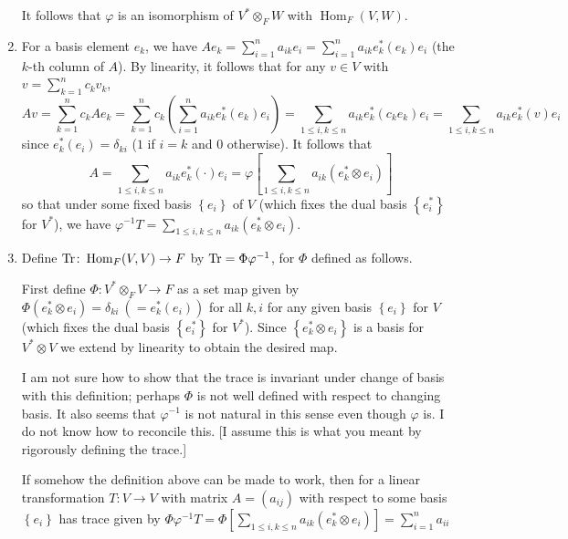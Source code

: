 \documentclass[11pt]{article}
\newcommand{\br}[1]{\left(#1\right)}
\newcommand{\sbr}[1]{\left[#1\right]}
\newcommand{\cbr}[1]{\left\{#1\right\}}
\DeclareMathOperator{\Hom}{Hom}
\begin{document}
\begin{enumerate}[label=(\alph*)]
    It follows that $\varphi$ is an isomorphism of $V^\ast\otimes_F W$ with $\Hom_F(V,W)$.
    \item For a basis element $e_k$, we have $Ae_k = \sum_{i=1}^n a_{ik}e_i = \sum_{i=1}^n a_{ik}e^\ast_k(e_k)e_i$ (the $k$-th column of $A$). By linearity, it follows that for any $v\in V$ with $v = \sum_{k=1}^nc_kv_k$, \[Av = \sum_{k=1}^n c_k Ae_k = \sum_{k=1}^n c_k \br{\sum_{i=1}^n a_{ik}e^\ast_k(e_k)e_i} = \sum_{1\leq i,k\leq n} a_{ik}e^\ast_k(c_ke_k)e_i = \sum_{1\leq i,k\leq n} a_{ik}e^\ast_k(v)e_i\] since $e^\ast_k(e_i) = \delta_{ki}$ ($1$ if $i=k$ and $0$ otherwise). It follows that \[A = \sum_{1\leq i,k\leq n} a_{ik}e^\ast_k(\cdot)e_i = \varphi\sbr{\sum_{1\leq i,k\leq n} a_{ik}(e^\ast_k\otimes e_i)}\] so that under some fixed basis $\cbr{e_i}$ of $V$ (which fixes the dual basis $\cbr{e_i^\ast}$ for $V^\ast$), we have $\varphi^{-1}T = \sum_{1\leq i,k\leq n} a_{ik}(e^\ast_k\otimes e_i)$. 
    \item Define $\Tr\colon \Hom_F(V,V)\to F$ by $\Tr = \Phi\varphi^{-1}$, for $\Phi$ defined as follows.
    
    First define $\Phi\colon V^\ast\otimes_F V\to F$ as a set map given by $\Phi(e^\ast_k\otimes e_i) = \delta_{ki} ~(= e^\ast_k(e_i))$ for all $k,i$ for any given basis $\cbr{e_i}$ for $V$ (which fixes the dual basis $\cbr{e^\ast_i}$ for $V^\ast$). Since $\cbr{e^\ast_k\otimes e_i}$ is a basis for $V^\ast\otimes V$ we extend by linearity to obtain the desired map.

    I am not sure how to show that the trace is invariant under change of basis with this definition; perhaps $\Phi$ is not well defined with respect to changing basis. It also seems that $\varphi^{-1}$ is not natural in this sense even though $\varphi$ is. I do not know how to reconcile this. [I assume this is what you meant by rigorously defining the trace.]
    
    If somehow the definition above can be made to work, then for a linear transformation $T\colon V\to V$ with matrix $A = (a_{ij})$ with respect to some basis $\cbr{e_i}$ has trace given by $\Phi\varphi^{-1}T = \Phi\sbr{\sum_{1\leq i,k\leq n} a_{ik}(e^\ast_k\otimes e_i)} = \sum_{i=1}^n a_{ii}$

    
\end{enumerate}
\end{document}
